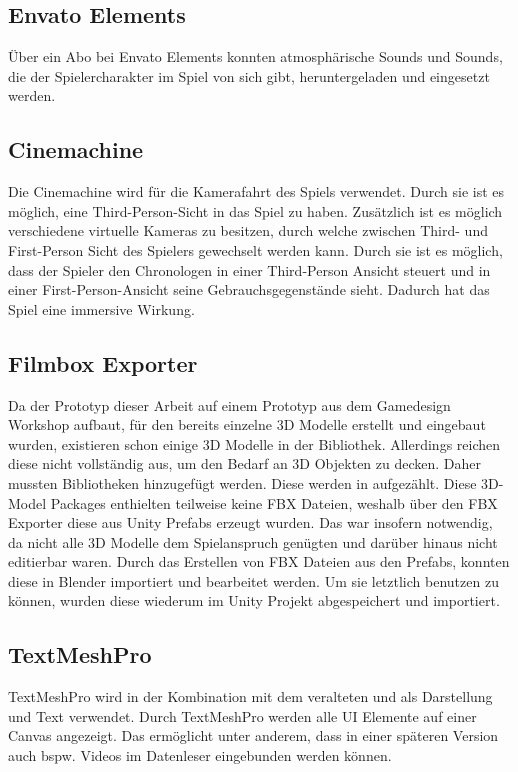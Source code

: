 \subsection{Envato Elements}
Über ein Abo bei Envato Elements konnten atmosphärische Sounds und Sounds, die der Spielercharakter im Spiel von sich gibt, heruntergeladen und eingesetzt werden.

\subsection{Cinemachine}
Die Cinemachine wird für die Kamerafahrt des Spiels verwendet. Durch sie ist es möglich, eine Third-Person-Sicht in das Spiel zu haben. Zusätzlich ist es möglich verschiedene virtuelle Kameras zu besitzen, durch welche zwischen Third- und First-Person Sicht des Spielers gewechselt werden kann. Durch sie ist es möglich, dass der Spieler den Chronologen in einer Third-Person Ansicht steuert und in einer First-Person-Ansicht seine Gebrauchsgegenstände sieht. Dadurch hat das Spiel eine immersive Wirkung.

\subsection{Filmbox Exporter}
Da der Prototyp dieser Arbeit auf einem Prototyp aus dem Gamedesign Workshop aufbaut, für den bereits einzelne \ac{3D} Modelle erstellt und eingebaut wurden, existieren schon einige \ac{3D} Modelle in der Bibliothek. Allerdings reichen diese nicht vollständig aus, um den Bedarf an \ac{3D} Objekten zu decken. Daher mussten Bibliotheken hinzugefügt werden. Diese werden in  aufgezählt. Diese \ac{3D}-Model Packages enthielten teilweise keine \ac{FBX} Dateien, weshalb über den \ac{FBX} Exporter diese aus Unity Prefabs erzeugt wurden. Das war insofern notwendig, da nicht alle \ac{3D} Modelle dem Spielanspruch genügten und darüber hinaus nicht editierbar waren. Durch das Erstellen von \ac{FBX} Dateien aus den Prefabs, konnten diese in Blender importiert und bearbeitet werden. Um sie letztlich benutzen zu können, wurden diese wiederum im Unity Projekt abgespeichert und importiert.

\subsection{TextMeshPro}
TextMeshPro wird in der Kombination mit dem veralteten  und  als Darstellung und Text verwendet. Durch TextMeshPro werden alle \ac{UI} Elemente auf einer Canvas angezeigt. Das ermöglicht unter anderem, dass in einer späteren Version auch bspw. Videos im Datenleser eingebunden werden können.


